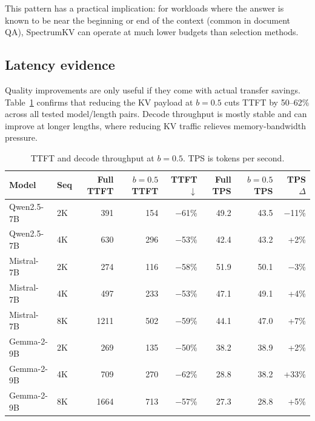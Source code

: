\documentclass[11pt]{article}
\newcommand{\method}{SpectrumKV}
\newcommand{\budget}{b}
\newcommand{\pct}{\%}
\theoremstyle{plain}
\theoremstyle{definition}
\begin{document}
This pattern has a practical implication: for workloads where the answer is known to be near the beginning or end of the context (common in document QA), \method{} can operate at much lower budgets than selection methods.

\subsection{Latency evidence}
\label{sec:rq9}

Quality improvements are only useful if they come with actual transfer savings.  Table~\ref{tab:latency} confirms that reducing the KV payload at $\budget=0.5$ cuts TTFT by 50--62\pct{} across all tested model/length pairs.  Decode throughput is mostly stable and can improve at longer lengths, where reducing KV traffic relieves memory-bandwidth pressure.

\begin{table}[t]
\centering
\caption{TTFT and decode throughput at $\budget=0.5$.  TPS is tokens per second.}
\label{tab:latency}
\small
\begin{tabular}{llrrrrrr}
\toprule
Model & Seq & Full TTFT & $\budget=0.5$ TTFT & TTFT $\downarrow$ & Full TPS & $\budget=0.5$ TPS & TPS $\Delta$ \\
\midrule
Qwen2.5-7B & 2K & 391 & 154 & $-$61\pct{} & 49.2 & 43.5 & $-$11\pct{} \\
Qwen2.5-7B & 4K & 630 & 296 & $-$53\pct{} & 42.4 & 43.2 & +2\pct{} \\
Mistral-7B & 2K & 274 & 116 & $-$58\pct{} & 51.9 & 50.1 & $-$3\pct{} \\
Mistral-7B & 4K & 497 & 233 & $-$53\pct{} & 47.1 & 49.1 & +4\pct{} \\
Mistral-7B & 8K & 1211 & 502 & $-$59\pct{} & 44.1 & 47.0 & +7\pct{} \\
Gemma-2-9B & 2K & 269 & 135 & $-$50\pct{} & 38.2 & 38.9 & +2\pct{} \\
Gemma-2-9B & 4K & 709 & 270 & $-$62\pct{} & 28.8 & 38.2 & +33\pct{} \\
Gemma-2-9B & 8K & 1664 & 713 & $-$57\pct{} & 27.3 & 28.8 & +5\pct{} \\
\bottomrule
\end{tabular}
\end{table}
\end{document}
